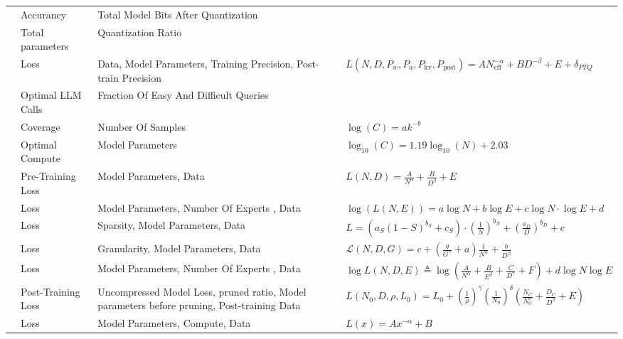 \begin{table*}[htbp]
{\begin{tabular}{p{35mm} p{35mm} p{45mm} p{125mm}}
    \citet{dettmers_case_2023} & Accurancy & Total Model Bits After Quantization &  \\
    \citet{cao_scaling_2024} & Total parameters & Quantization Ratio &  \\
    \citet{kumar_scaling_2024} & Loss & Data, Model Parameters, Training Precision, Post-train Precision & \(L(N, D, P_w, P_a, P_{\text{kv}}, P_{\text{post}}) =AN_{\text{eff}}^{-\alpha} + BD^{-\beta} + E + \delta_{PTQ}\) \\
    \citet{chen_are_2024} & Optimal LLM Calls & Fraction Of Easy And Difficult Queries &  \\
    \citet{brown_large_2024} & Coverage & Number Of Samples & \(\log(C) = ak^{-b}\) \\
    \citet{wu_inference_2024} & Optimal Compute   & Model Parameters & \(\log_{10}(C) = 1.19\log_{10}(N) + 2.03\) \\
    \citet{sardana_beyond_2024} & Pre-Training Loss & Model Parameters, Data & \(L(N,D) = \frac{A}{N^\alpha} + \frac{B}{D^\beta} + E\) \\
    \citet{clark_unified_2022} & Loss & Model Parameters, Number Of Experts , Data & \(\log(L(N,E)) = a\log N + b\log E + c\log N\cdot\log E + d\)  \\
    \citet{frantar_scaling_2023} & Loss & Sparsity, Model Parameters, Data & \(L=(a_S(1-S)^{b_S} + c_S) \cdot \left(\frac{1}{N}\right)^{b_N} + \left(\frac{a_D}{D}\right)^{b_D} + c\) \\
    \citet{krajewski_scaling_2024} & Loss & Granularity, Model Parameters, Data & \(\mathcal{L}(N,D,G) = c + \left(\frac{g}{G^\gamma} + a\right)\frac{1}{N^\alpha} + \frac{b}{D^\beta}\) \\
    \citet{yun_toward_2024} & Loss & Model Parameters, Number Of Experts , Data & \( \log L(N,D,E) \triangleq \log\left(\frac{A}{N^\alpha} + \frac{B}{E^\beta} + \frac{C}{D^\gamma} + F\right) + d\log N\log E \)\\
    \citet{chen2024scaling} &  Post-Training Loss  & Uncompressed Model Loss, pruned ratio, Model parameters before pruning, Post-training Data      & \(L(N_0, D, \rho, L_0) =  L_0 + \left( \frac{1}{\rho} \right)^\gamma  \left( \frac{1}{N_0} \right)^\delta  \left( \frac{N_C}{N_0^\alpha} + \frac{D_C}{D^\beta} + E \right)\) \\
    \citet{henighan_scaling_2020} & Loss & Model Parameters, Compute, Data & \(L(x) = Ax^{-\alpha} + B\) \\

\end{tabular}}
\end{table*}
